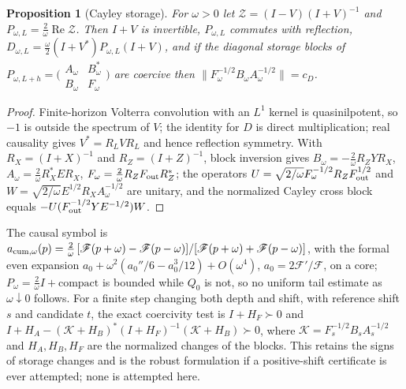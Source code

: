 \documentclass[11pt]{article}
\numberwithin{equation}{section}
\newtheorem{proposition}[theorem]{Proposition}
\theoremstyle{definition}
\theoremstyle{remark}
\newcommand{\Rea}{\operatorname{Re}}
\newcommand{\norm}[1]{\lVert#1\rVert}
\begin{document}
\begin{proposition}[Cayley storage]\label{prop:cayley}
For $\omega>0$ let $\mathcal Z=(I-V)(I+V)^{-1}$ and $P_{\omega,L}=\tfrac2\omega\Rea\mathcal Z$. Then $I+V$ is invertible, $P_{\omega,L}$ commutes with reflection, $D_{\omega,L}=\tfrac\omega2(I+V^*)P_{\omega,L}(I+V)$, and if the diagonal storage blocks of $P_{\omega,L+h}=\bigl(\begin{smallmatrix}A_\omega&B_\omega^*\\B_\omega&F_\omega\end{smallmatrix}\bigr)$ are coercive then $\norm{F_\omega^{-1/2}B_\omega A_\omega^{-1/2}}=c_D$.
\end{proposition}
\begin{proof}
Finite-horizon Volterra convolution with an $L^1$ kernel is quasinilpotent, so $-1$ is outside the spectrum of $V$; the identity for $D$ is direct multiplication; real causality gives $V^*=R_LVR_L$ and hence reflection symmetry. With $R_X=(I+X)^{-1}$ and $R_Z=(I+Z)^{-1}$, block inversion gives $B_\omega=-\tfrac2\omega R_ZYR_X$, $A_\omega=\tfrac2\omega R_X^*ER_X$, $F_\omega=\tfrac2\omega R_ZF_{\rm out}R_Z^*$; the operators $U=\sqrt{2/\omega}F_\omega^{-1/2}R_ZF_{\rm out}^{1/2}$ and $W=\sqrt{2/\omega}E^{1/2}R_XA_\omega^{-1/2}$ are unitary, and the normalized Cayley cross block equals $-U(F_{\rm out}^{-1/2}YE^{-1/2})W$.
\end{proof}

The causal symbol is $a_{{\rm cum},\omega}(p)=\tfrac2\omega\,[\mathscr F(p+\omega)-\mathscr F(p-\omega)]/[\mathscr F(p+\omega)+\mathscr F(p-\omega)]$, with the formal even expansion $a_0+\omega^2(a_0''/6-a_0^3/12)+O(\omega^4)$, $a_0=2\mathscr F'/\mathscr F$, on a core; $P_\omega=\tfrac2\omega I+\text{compact}$ is bounded while $Q_0$ is not, so no uniform tail estimate as $\omega\downarrow0$ follows. For a finite step changing both depth and shift, with reference shift $s$ and candidate $t$, the exact coercivity test is $I+H_F\succ0$ and $I+H_A-(\mathcal K+H_B)^*(I+H_F)^{-1}(\mathcal K+H_B)\succ0$, where $\mathcal K=F_s^{-1/2}B_sA_s^{-1/2}$ and $H_A,H_B,H_F$ are the normalized changes of the blocks. This retains the signs of storage changes and is the robust formulation if a positive-shift certificate is ever attempted; none is attempted here.
\end{document}

